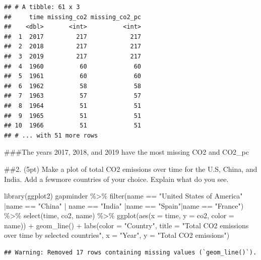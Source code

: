 \documentclass[
]{article}
\newenvironment{Shaded}{\begin{snugshade}}{\end{snugshade}}
\newcommand{\AttributeTok}[1]{\textcolor[rgb]{0.77,0.63,0.00}{#1}}
\newcommand{\FunctionTok}[1]{\textcolor[rgb]{0.00,0.00,0.00}{#1}}
\newcommand{\NormalTok}[1]{#1}
\newcommand{\SpecialCharTok}[1]{\textcolor[rgb]{0.00,0.00,0.00}{#1}}
\newcommand{\StringTok}[1]{\textcolor[rgb]{0.31,0.60,0.02}{#1}}
\begin{document}
\begin{verbatim}
## # A tibble: 61 x 3
##     time missing_co2 missing_co2_pc
##    <dbl>       <int>          <int>
##  1  2017         217            217
##  2  2018         217            217
##  3  2019         217            217
##  4  1960          60             60
##  5  1961          60             60
##  6  1962          58             58
##  7  1963          57             57
##  8  1964          51             51
##  9  1965          51             51
## 10  1966          51             51
## # ... with 51 more rows
\end{verbatim}

\#\#\#The years 2017, 2018, and 2019 have the most missing CO2 and
CO2\_pc

\#\#2. (5pt) Make a plot of total CO2 emissions over time for the U.S,
China, and India. Add a fewmore countries of your choice. Explain what
do you see.

\begin{Shaded}
\begin{Highlighting}[]
\FunctionTok{library}\NormalTok{(ggplot2)}
\NormalTok{gapminder }\SpecialCharTok{\%\textgreater{}\%}
  \FunctionTok{filter}\NormalTok{(name }\SpecialCharTok{==} \StringTok{"United States of America"} \SpecialCharTok{|}\NormalTok{name }\SpecialCharTok{==} \StringTok{"China"} \SpecialCharTok{|}\NormalTok{ name }\SpecialCharTok{==} \StringTok{"India"} \SpecialCharTok{|}\NormalTok{name }\SpecialCharTok{==} \StringTok{"Spain"}\SpecialCharTok{|}\NormalTok{name }\SpecialCharTok{==} \StringTok{"France"}\NormalTok{) }\SpecialCharTok{\%\textgreater{}\%}
  \FunctionTok{select}\NormalTok{(time, co2, name) }\SpecialCharTok{\%\textgreater{}\%}
  \FunctionTok{ggplot}\NormalTok{(}\FunctionTok{aes}\NormalTok{(}\AttributeTok{x =}\NormalTok{ time, }\AttributeTok{y =}\NormalTok{ co2, }\AttributeTok{color =}\NormalTok{ name)) }\SpecialCharTok{+}
  \FunctionTok{geom\_line}\NormalTok{() }\SpecialCharTok{+}
  \FunctionTok{labs}\NormalTok{(}\AttributeTok{color =} \StringTok{"Country"}\NormalTok{, }\AttributeTok{title =} \StringTok{"Total CO2 emissions over time by selected countries"}\NormalTok{, }\AttributeTok{x =} \StringTok{"Year"}\NormalTok{, }\AttributeTok{y =} \StringTok{"Total CO2 emissions"}\NormalTok{)}
\end{Highlighting}
\end{Shaded}

\begin{verbatim}
## Warning: Removed 17 rows containing missing values (`geom_line()`).
\end{verbatim}
\end{document}
